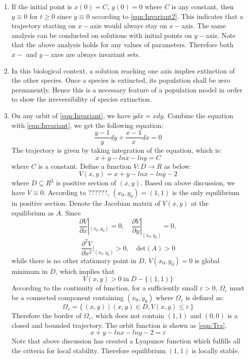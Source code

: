 \begin{enumerate}
\item If the initial point is $x(0)=C$, $y(0)=0$ where $C$ is any constant, then $y \equiv 0$ for $t \geqslant 0$ since $\dot{y} \equiv 0$ according to \eqref{eqn:Invariant2}. This indicates that a trajectory starting on $x-$axis would always stay on $x-$axis. The same analysis can be conducted on solutions with initial points on $y-$axis. Note that the above analysis holds for any values of parameters. Therefore both $x-$ and $y-$axes are always invariant sets.
\item In this biological context, a solution reaching one axis implies extinction of the other species. Once a species is extincted, its population shall be zero permanently. Hence this is a necessary feature of a population model in order to show the irreversibility of species extinction.
\item On any orbit of \eqref{eqn:Invariant}, we have $\dot{y}dx = \dot{x}dy$. Combine the equation with \eqref{eqn:Invariant}, we get the following equation:
$$\frac{y-1}{y} dy + \frac{x-1}{x} dx = 0$$
The trajectory is given by taking integration of the equation, which is:
$$x+y-lnx-lny=C$$
where $C$ is a constant. Define a function $V:D\to R$  as below:
\begin{equation}\label{fun:Lya}
V(x,y)=x+y-lnx-lny-2
\end{equation}
where $D \subseteq R^2$ is positive section of $(x,y)$. Based on above discussion, we have $\dot{V} \equiv 0$. According to ??????, $(x_0,y_0)=(1,1)$ is the only equilibrium in positive section. Denote the Jacobian matrix of $V(x,y)$ at the equilibrium as $A$. Since 
$$\frac{\partial V}{\partial x}|_{(x_0,y_0)} = 0, \quad \frac{\partial V}{\partial y}|_{(x_0,y_0)} = 0,$$ 
$$\frac{\partial^2 V}{\partial x^2}|_{(x_0,y_0)} > 0, \quad \text{det}(A)>0$$
while there is no other stationary point in $D$, $V(x_0,y_0)=0$ is global minimum in $D$, which implies that 
$$V(x,y)>0\; \text{in}\; D-\{(1,1)\}$$
According to the continuity of function, for a sufficiently small $\varepsilon > 0$, $\Omega_\varepsilon$ must be a connected component containing $(x_0,y_0)$ where $\Omega_\varepsilon$ is defined as:
$$\Omega_\varepsilon=\{\,(x,y) \mid (x,y) \in D, V(x,y) \leqslant \varepsilon\,\}$$
Therefore the border of $\Omega_\varepsilon$, which does not contain $(1,1)$ and $(0,0)$ is a closed and bounded trajectory. The orbit function is shown as \eqref{eqn:Tra}.
 \begin{equation} \label{eqn:Tra}
x+y-lnx-lny-2 = \varepsilon
\end{equation}
Note that above discussion has created a Lyapunov function which fulfills all the criteria for local stability. Therefore equilibrium $(1,1)$ is locally stable.
\end{enumerate}